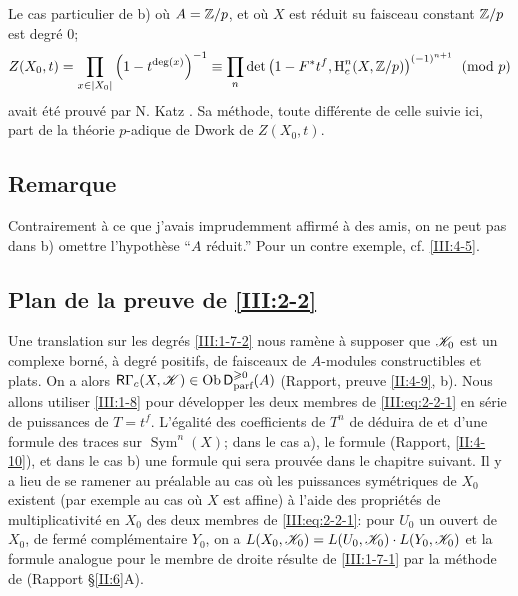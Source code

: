 Le cas particulier de b) o\`u $A=\mathbb{Z}/p$, et o\`u $X$ est r\'eduit su faisceau 
constant $\mathbb{Z}/p$ est degr\'e $0$;
\[
  Z(X_0,t) = \prod_{x\in |X_0|} \left(1-t^{\deg(x)}\right)^{-1}
      \equiv \prod_n \det\left(1-F^* t^f,\operatorname{H}_c^n(X,\mathbb{Z}/p)\right)^{(-1)^{n+1}} \pmod p
\]
avait \'et\'e prouv\'e par N. Katz \cite[XXII 3.1]{sga7}. Sa m\'ethode, toute 
diff\'erente de celle suivie ici, part de la th\'eorie $p$-adique de Dwork de 
$Z(X_0,t)$. 





\subsection{Remarque}\label{III:2-7}


Contrairement \`a ce que j'avais imprudemment affirm\'e \`a des amis, on ne 
peut pas dans b) omettre l'hypoth\`ese ``$A$ r\'eduit.'' Pour un contre 
exemple, cf. \ref{III:4-5}. 





\subsection{Plan de la preuve de \ref{III:2-2}}\label{III:2-8}

Une translation sur les degr\'es \ref{III:1-7-2} nous ram\`ene \`a supposer 
que $\mathscr{K}_0$ est un complexe born\'e, \`a degr\'e positifs, de faisceaux de 
$A$-modules constructibles et plats. On a alors 
$\mathsf{R}\Gamma_c(X,\mathscr{K})\in \operatorname{Ob}\mathsf{D}_\text{parf}^{\geqslant 0}(A)$ (Rapport, 
preuve \ref{II:4-9}, b). Nous allons utiliser \ref{III:1-8} pour d\'evelopper 
les deux membres de \eqref{III:eq:2-2-1} en s\'erie de puissances de $T=t^f$. 
L'\'egalit\'e des coefficients de $T^n$ de d\'eduira de 
\cite[XVII 5.5.21]{sga4} et d'une formule des traces sur 
$\operatorname{Sym}^n(X)$; dans le cas a), le formule (Rapport, 
\ref{II:4-10}), et dans le cas b) une formule qui sera prouv\'ee dans le 
chapitre suivant. Il y a lieu de se ramener au pr\'ealable au cas o\`u les 
puissances sym\'etriques de $X_0$ existent (par exemple au cas o\`u $X$ est 
affine) \`a l'aide des propri\'et\'es de multiplicativit\'e en $X_0$ des deux 
membres de \eqref{III:eq:2-2-1}: pour $U_0$ un ouvert de $X_0$, de ferm\'e 
compl\'ementaire $Y_0$, on a $L(X_0,\mathscr{K}_0)=L(U_0,\mathscr{K}_0)\cdot L(Y_0,\mathscr{K}_0)$ et 
la formule analogue pour le membre de droite r\'esulte de \ref{III:1-7-1} 
par la m\'ethode de (Rapport \S\ref{II:6}A). 





